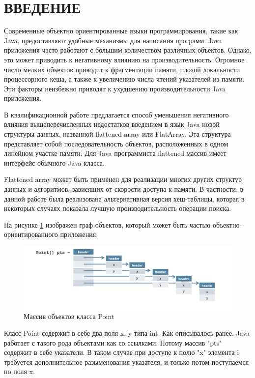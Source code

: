 \section{ВВЕДЕНИЕ}

Современные объектно ориентированные языки программирования, такие как Java, предоставляют удобные механизмы для написания программ. Java приложения часто работают с большим количеством различных объектов. 
Однако, это может приводить к негативному влиянию на производительность. Огромное число мелких объектов приводит к фрагментации памяти, плохой локальности процессорного кеша, а также к увеличению числа чтений указателей из памяти. Эти факторы неизбежно приводят к ухудшению производительности Java приложения.
\par
В квалификационной работе предлагается способ уменьшения негативного влияния вышеперечисленных недостатков введением в язык Java новой структуры данных, названной flattened array или FlatArray. Эта структура представляет собой последовательность объектов, расположенных в одном линейном участке памяти. 
Для Java программиста flattened массив имеет интерфейс обычного Java класса.
\par
Flattened array может быть применен для реализации многих других структур данных и алгоритмов, зависящих от скорости доступа к памяти. В частности, в данной работе была реализована альтернативная версия хеш-таблицы, которая в некоторых случаях показала лучшую производительность операции поиска.
\par
На рисунке \ref{ref-graph} изображен граф объектов, который может быть частью объектно-ориентированного приложения.
\begin{figure}[h]
	\includegraphics[width=0.95\linewidth]{image/reference.png}
	\caption{Массив объектов класса Point}\label{ref-graph}
\end{figure}
Класс Point содержит в себе два поля x, y типа int. Как описывалось ранее, Java работает с 
такого рода объектами как со ссылками. Потому массив "pts" содержит в себе указатели. В таком случае при доступе к полю "x" элемента i требуется дополнительное разыменования указателя, и только потом поступаемся по поля x.
